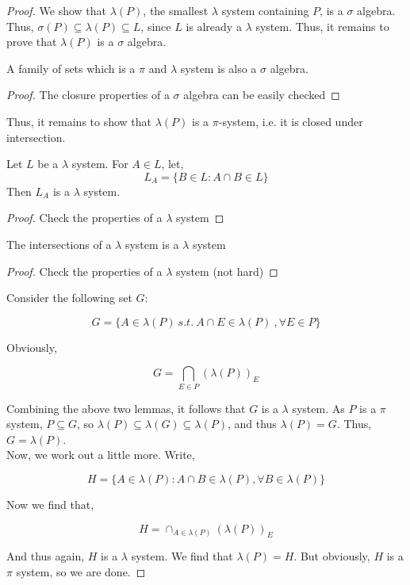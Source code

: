 \begin{proof}
   We show that $\lambda(P)$, the smallest $\lambda$ system containing $P$, is a 
   $\sigma$ algebra. Thus, $\sigma(P) \subseteq \lambda(P) \subseteq L$, since 
   $L$ is already a $\lambda$ system. Thus, it remains to prove that $\lambda(P)$ is a 
   $\sigma$ algebra.

   \begin{Proposition}
      A family of sets which is a $\pi$ and $\lambda$ system is also a $\sigma$ algebra.
   \end{Proposition}

   \begin{proof}
      The closure properties of a $\sigma$ algebra can be easily checked
   \end{proof}

   Thus, it remains to show that $\lambda(P)$ is a $\pi$-system, i.e. it is closed under 
   intersection. 

   \begin{lemma}
      Let $L$ be a $\lambda$ system. For $A \in L$, let, 
      \[ L_A = \{B \in L : A \cap B \in L\} \]
      Then $L_A$ is a $\lambda$ system.
   \end{lemma}

   \begin{proof}
      Check the properties of a $\lambda$ system
   \end{proof}

   \begin{lemma}
      The intersections of a $\lambda$ system is a $\lambda$ system
   \end{lemma}

   \begin{proof}
      Check the properties of a $\lambda$ system (not hard)
   \end{proof}

   Consider the following set $G$:

   \[ G = \{A \in \lambda(P) \: s.t. \: A \cap E  \in \lambda(P) \:, \forall E \in P \} \]

   Obviously, 

   \[ G = \bigcap_{E \in P}(\lambda(P))_E \]

   Combining the above two lemmas, it follows that $G$ is a 
   $\lambda$ system. As $P$ is a $\pi$ system, 
   $P \subseteq G$, so $\lambda(P) \subseteq \lambda(G) \subseteq \lambda(P)$, and 
   thus $\lambda(P) = G$. Thus, $G = \lambda(P)$. \\ 

   Now, we work out a little more. Write, 

   \[ H = \{ A \in \lambda(P) : A \cap B \in \lambda(P), \forall B \in \lambda(P) \} \]

   Now we find that, 

   \[ H = \cap_{A \in \lambda(P)} (\lambda(P))_E \]

   And thus again, $H$ is a $\lambda$ system. We find that 
   $\lambda(P) = H$. But obviously, $H$ is a $\pi$ system, so 
   we are done.

\end{proof}

